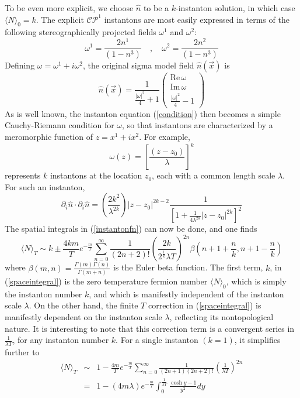 \documentclass[a4paper,prd]{revtex4}
\begin{document}
To be even more explicit, we choose $\hat{n}$ to be a 
 $k$-instanton solution, in which case $\langle N \rangle _0=k$. The
explicit $\mathcal{CP}^{1}$ instantons are most easily expressed in terms
of the following stereographically projected fields $\omega^1$ and
$\omega^2$:
\begin{equation}
 \omega^{1}=\frac{2 n^{1}}{(1-n^{3})} \quad , \quad \omega^{2}=
\frac{2 n^{2}}{(1-n^{3})}
\end{equation}
Defining $\omega =\omega ^{1} +i \omega ^{2}$, the
original sigma model field $\hat{n}(\vec{x})$ is
\begin{equation}
\hat{n}(\vec{x})=\frac{1}{\frac{|\omega |^{2}}{4} +1}\left(\begin{array}{ccc} 
\textrm{Re}
\,\omega \\ \textrm{Im}\,\omega \\ \frac{|\omega|^{2}}{4} -1 \end{array}
\right)
\label{instfield}
\end{equation}
As is well known, the instanton equation (\ref{condition}) then becomes a
simple Cauchy-Riemann condition for $\omega$, so that instantons are
characterized by a meromorphic function of $z=x^1+i x^2$. For example,
\begin{equation}
\omega(z)=\left[\frac{(z-z_{0})}{\lambda }\right]^{k}
\end{equation}
represents $k$ instantons at the location $z_0$, each with a common
length scale $\lambda$. For such an instanton,
\begin{equation}
\partial _{i}\hat{n}\cdot \partial _{i}\hat{n}=\left( \frac{2 k^{2}}{\lambda ^{2k}}\right) 
|z -z_{0}|^{2k-2} \frac{1}{\left[1+\frac{1}{4 \lambda^{2k}}
|z-z_{0}|^{2 k}\right]^{2}}
\end{equation}
The spatial integrals in (\ref{instantonfn}) can now be done, and one
finds
\begin{equation}
\langle N\rangle _{T}\sim k \pm \frac{4k m}{T} e^{-\frac{m}{T}} 
\sum_{n=0}^\infty \frac{1}{(2 n+2)!}\left(\frac{2 k}{2^{\frac{1}{k}} \lambda T}\right)^{2 n}
\beta\left(n+1+\frac{n}{k}, n+1-\frac{n}{k}\right)
\label{spaceintegral}
\end{equation}
where $\beta(m, n)=\frac{\Gamma(m) \Gamma(n)}{\Gamma(m+n)}$ is the
Euler beta function. The first term, $k$, in (\ref{spaceintegral}) is the
zero temperature fermion number $\langle N \rangle _{0}$, which is simply
the instanton number $k$, and which is manifestly independent of the
instanton scale $\lambda$. On the other hand, the finite $T$ correction
in (\ref{spaceintegral}) is manifestly dependent on the instanton scale
$\lambda$, reflecting its nontopological nature. It is interesting to
note that this correction term is a convergent series in $\frac{1}{\lambda
T}$, for any instanton number $k$. For a single instanton $(k=1)$, it
simplifies further to
\begin{eqnarray}
\langle N\rangle _{T}& \sim & 1 - \frac{4 m}{T} e^{-\frac{m}{T}}\sum_{n=0}^\infty 
\frac{1}{(2 n +1)(2 n+2)!} \left(\frac{1}{\lambda T}\right)^{2 n}\nonumber \\
 {} &=&1 - (4 m \lambda)e^{-\frac{m}{T}}\int_{0}^{\frac{1}{\lambda T}} 
\frac{\cosh y -1}{y^2} dy 
\label{fninst}
\end{eqnarray}
\end{document}
